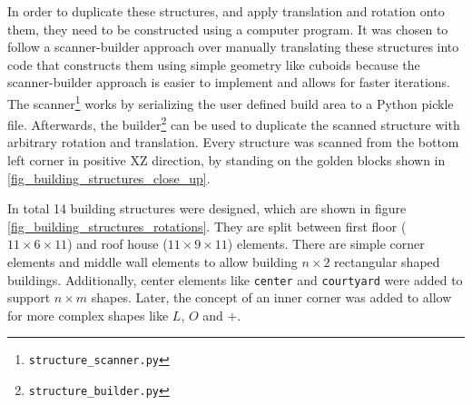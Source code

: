 \documentclass[
oneside,
fontsize=11pt
]{scrartcl}
\begin{document}
In order to duplicate these structures, and apply translation and rotation onto them,
they need to be constructed using a computer program.
It was chosen to follow a scanner-builder approach over 
manually translating these structures into code that constructs them using 
simple geometry like cuboids 
because the scanner-builder approach is easier to implement 
and allows for faster iterations.
The scanner\footnote{\texttt{structure\_scanner.py}} works by 
serializing the user defined build area to a Python pickle file. 
Afterwards, the builder\footnote{\texttt{structure\_builder.py}} 
can be used to duplicate the scanned structure with arbitrary rotation and translation.
Every structure was scanned from the bottom left corner in positive XZ direction, 
by standing on the golden blocks shown in \autoref{fig_building_structures_close_up}.

In total 14 building structures were designed, which are shown in figure \autoref{fig_building_structures_rotations}.
They are split between first floor ($11 \times 6 \times 11$) and roof house ($11 \times 9 \times 11$) elements.
There are simple corner elements and middle wall elements to allow building $n \times 2$
rectangular shaped buildings.
Additionally, center elements like \texttt{center} and \texttt{courtyard} were added to 
support $n \times m$ shapes. 
Later, the concept of an inner corner was added to allow for more complex shapes like  
$L$, $O$ and $+$.
\end{document}
